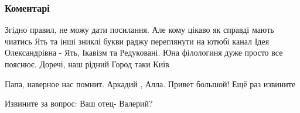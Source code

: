 
 
 
 
 
\subsubsection{Коментарі}
\label{sec:01_08_2021.fb.fb_group.story_kiev_ua.2.kvitka_osnovjanenko_pismo.cmt}

\begin{itemize}
 

Згідно правил, не можу дати посилання. Але кому цікаво як справді мають чиатись
Ять та інші зниклі букви раджу переглянути на ютюбі канал Ідея Олександрівна -
Ять, Ікавізм та Редуковані. Юна філологиня дуже просто все пояснює. Доречі, наш
рідний Город таки Київ \Smiley[1.0][yellow]



 
Папа, наверное нас помнит. Аркадий , Алла. Привет большой! Ещё раз извините

 
Извините за вопрос: Ваш отец- Валерий?

\begin{itemize}
 


\end{itemize}
\end{itemize}
